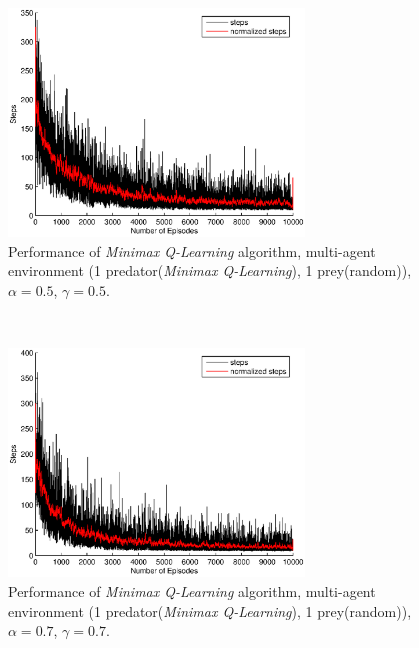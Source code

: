 \documentclass[a4paper,11pt]{article}
\begin{document}
\begin{figure}[ht!]
  \centering
    \includegraphics[width=0.7\textwidth]{figures/minimax0505.eps}
    \caption{Performance of  \textit{Minimax Q-Learning} algorithm, multi-agent environment (1 predator(\textit{Minimax Q-Learning}), 1 prey(random)), $\alpha = 0.5$, $\gamma = 0.5$.}
    \label{m11}
\end{figure}
~
\begin{figure}[ht!]
  \centering
	\includegraphics[width=0.7\textwidth]{figures/minimax0707.eps}
   \caption{Performance of  \textit{Minimax Q-Learning} algorithm, multi-agent environment (1 predator(\textit{Minimax Q-Learning}), 1 prey(random)), $\alpha = 0.7$, $\gamma = 0.7$.}
    \label{m22}
\end{figure}
~
\end{document}
